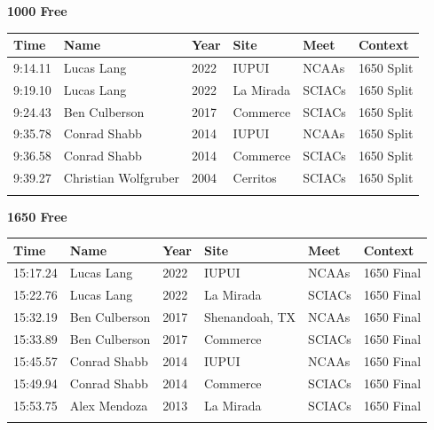\vspace{1.2em}
\noindent\begin{minipage}[t]{0.98\textwidth}
\centering
\textbf{\textcolor{teamprimary}{1000 Free}}\par
\vspace{0.5em}
\centering
\small
\renewcommand{\arraystretch}{1.0}
\setlength{\tabcolsep}{4pt}
\begin{tabular}{@{}p{2.0cm}p{3.2cm}p{1.2cm}p{2.0cm}p{2.0cm}p{2.5cm}@{}}
\toprule
\textbf{Time} & \textbf{Name} & \textbf{Year} & \textbf{Site} & \textbf{Meet} & \textbf{Context} \\
\midrule
9:14.11 & Lucas Lang & 2022 & IUPUI & NCAAs & 1650 Split \\
9:19.10 & Lucas Lang & 2022 & La Mirada & SCIACs & 1650 Split \\
9:24.43 & Ben Culberson & 2017 & Commerce & SCIACs & 1650 Split \\
9:35.78 & Conrad Shabb & 2014 & IUPUI & NCAAs & 1650 Split \\
9:36.58 & Conrad Shabb & 2014 & Commerce & SCIACs & 1650 Split \\
9:39.27 & Christian Wolfgruber & 2004 & Cerritos & SCIACs & 1650 Split \\
\bottomrule
\vspace{0.5em}
\end{tabular}
\end{minipage}
\vspace{1.2em}
\noindent\begin{minipage}[t]{0.98\textwidth}
\centering
\textbf{\textcolor{teamprimary}{1650 Free}}\par
\vspace{0.5em}
\centering
\small
\renewcommand{\arraystretch}{1.0}
\setlength{\tabcolsep}{4pt}
\begin{tabular}{@{}p{2.0cm}p{3.2cm}p{1.2cm}p{2.0cm}p{2.0cm}p{2.5cm}@{}}
\toprule
\textbf{Time} & \textbf{Name} & \textbf{Year} & \textbf{Site} & \textbf{Meet} & \textbf{Context} \\
\midrule
15:17.24 & Lucas Lang & 2022 & IUPUI & NCAAs & 1650 Final \\
15:22.76 & Lucas Lang & 2022 & La Mirada & SCIACs & 1650 Final \\
15:32.19 & Ben Culberson & 2017 & Shenandoah, TX & NCAAs & 1650 Final \\
15:33.89 & Ben Culberson & 2017 & Commerce & SCIACs & 1650 Final \\
15:45.57 & Conrad Shabb & 2014 & IUPUI & NCAAs & 1650 Final \\
15:49.94 & Conrad Shabb & 2014 & Commerce & SCIACs & 1650 Final \\
15:53.75 & Alex Mendoza & 2013 & La Mirada & SCIACs & 1650 Final \\
\bottomrule
\vspace{0.5em}
\end{tabular}
\end{minipage}
